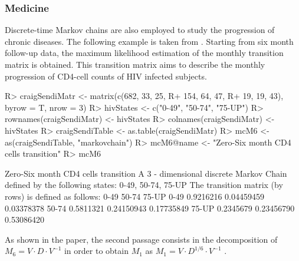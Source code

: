 \documentclass[article,nojss]{jss}
\begin{document}
\hypertarget{sec:medicine}{%
\subsubsection{Medicine}\label{sec:medicine}}

Discrete-time Markov chains are also employed to study the progression of chronic diseases. The following example is taken from \cite{craigSendi}. Starting from six month follow-up data, the maximum likelihood estimation of the monthly transition matrix is obtained. This transition matrix aims to describe the monthly progression of CD4-cell counts of HIV infected subjects.

\begin{CodeChunk}

\begin{CodeInput}
R> craigSendiMatr <- matrix(c(682, 33, 25,
R+               154, 64, 47,
R+               19, 19, 43), byrow = T, nrow = 3)
R> hivStates <- c("0-49", "50-74", "75-UP")
R> rownames(craigSendiMatr) <- hivStates
R> colnames(craigSendiMatr) <- hivStates
R> craigSendiTable <- as.table(craigSendiMatr)
R> mcM6 <- as(craigSendiTable, "markovchain")
R> mcM6@name <- "Zero-Six month CD4 cells transition"
R> mcM6
\end{CodeInput}

\begin{CodeOutput}
Zero-Six month CD4 cells transition 
 A  3 - dimensional discrete Markov Chain defined by the following states: 
 0-49, 50-74, 75-UP 
 The transition matrix  (by rows)  is defined as follows: 
           0-49      50-74      75-UP
0-49  0.9216216 0.04459459 0.03378378
50-74 0.5811321 0.24150943 0.17735849
75-UP 0.2345679 0.23456790 0.53086420
\end{CodeOutput}
\end{CodeChunk}

As shown in the paper, the second passage consists in the decomposition of \(M_{6}=V \cdot D \cdot V^{-1}\) in order to obtain \(M_{1}\) as \(M_{1}=V \cdot D^{1/6} \cdot V^{-1}\) .

\begin{CodeChunk}

\end{CodeChunk}
\end{document}
